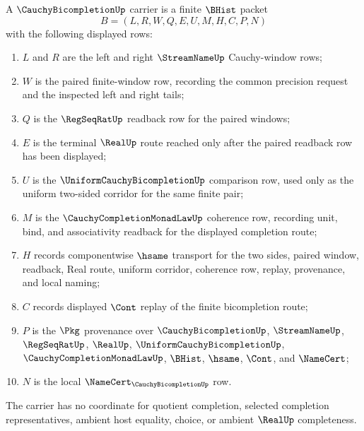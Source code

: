 \begin{definition}
\label{def:cauchy-bicompletion-carrier}
A $\CauchyBicompletionUp$ carrier is a finite $\BHist$ packet
$$
B=(L,R,W,Q,E,U,M,H,C,P,N)
$$
with the following displayed rows:
\begin{enumerate}
\item $L$ and $R$ are the left and right $\StreamNameUp$ Cauchy-window rows;
\item $W$ is the paired finite-window row, recording the common precision request and the inspected left and right tails;
\item $Q$ is the $\RegSeqRatUp$ readback row for the paired windows;
\item $E$ is the terminal $\RealUp$ route reached only after the paired readback row has been displayed;
\item $U$ is the $\UniformCauchyBicompletionUp$ comparison row, used only as the uniform two-sided corridor for the same finite pair;
\item $M$ is the $\CauchyCompletionMonadLawUp$ coherence row, recording unit, bind, and associativity readback for the displayed completion route;
\item $H$ records componentwise $\hsame$ transport for the two sides, paired window, readback, Real route, uniform corridor, coherence row, replay, provenance, and local naming;
\item $C$ records displayed $\Cont$ replay of the finite bicompletion route;
\item $P$ is the $\Pkg$ provenance over $\CauchyBicompletionUp$, $\StreamNameUp$, $\RegSeqRatUp$, $\RealUp$, $\UniformCauchyBicompletionUp$, $\CauchyCompletionMonadLawUp$, $\BHist$, $\hsame$, $\Cont$, and $\NameCert$;
\item $N$ is the local $\NameCert_{\CauchyBicompletionUp}$ row.
\end{enumerate}
The carrier has no coordinate for quotient completion, selected completion representatives, ambient host equality, choice, or ambient $\RealUp$ completeness.
\end{definition}

